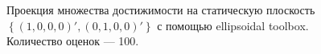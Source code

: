 \documentclass[10pt, a4paper]{article}
\begin{document}
\begin{figure}[H]
\caption{Проекция множества достижимости на статическую плоскость $\left\{(1,0,0,0)',(0,1,0,0)'\right\}$ с помощью ellipsoidal toolbox. Количество оценок --- 100.}
\end{figure}
\end{document}
